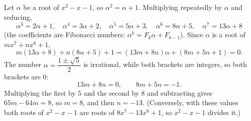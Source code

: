 Let $\alpha$ be a root of $x^2-x-1$, so $\alpha^2=\alpha+1$. Multiplying repeatedly by $\alpha$ and reducing,
\[
\alpha^3=2\alpha+1,\quad\alpha^4=3\alpha+2,\quad\alpha^5=5\alpha+3,\quad\alpha^6=8\alpha+5,\quad\alpha^7=13\alpha+8
\]
(the coefficients are Fibonacci numbers: $\alpha^k=F_k\alpha+F_{k-1}$). Since $\alpha$ is a root of $mx^7+nx^6+1$,
\[
m(13\alpha+8)+n(8\alpha+5)+1=(13m+8n)\alpha+(8m+5n+1)=0 .
\]
The number $\alpha=\dfrac{1\pm\sqrt5}{2}$ is irrational, while both brackets are integers, so both brackets are $0$:
\[
13m+8n=0,\qquad 8m+5n=-1 .
\]
Multiplying the first by $5$ and the second by $8$ and subtracting gives $65m-64m=8$, so $m=\boxed{8}$, and then $n=-13$. (Conversely, with these values both roots of $x^2-x-1$ are roots of $8x^7-13x^6+1$, so $x^2-x-1$ divides it.)
